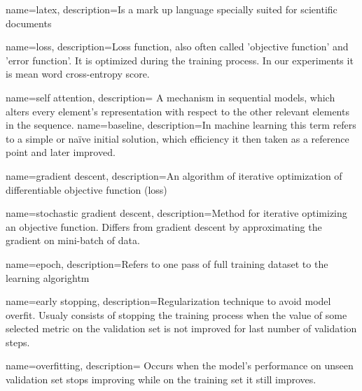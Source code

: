 

\makeglossaries

{
    name=latex,
    description={Is a mark up language specially suited 
    for scientific documents}
}

{
    name=loss,
    description={Loss function, also often called 'objective function' and
		 'error function'. It is optimized during the training
		 process. In our experiments it is mean word cross-entropy score.}
}

{
    name=self attention,
    description={
		A mechanism in sequential models, which alters every element's
		representation with respect to the other relevant elements in the
		sequence.
		}
}
{
    name=baseline,
    description={In machine learning this term refers to a simple or
		 naïve initial solution, which efficiency it then
		 taken as a reference point and later improved.
		}
}

{
    name=gradient descent,
    description={An algorithm of iterative optimization of 
		 differentiable objective function (loss)}
}

{
    name=stochastic gradient descent,
    description={Method for iterative optimizing an objective function.
		 Differs from gradient descent by approximating the gradient
		 on mini-batch of data.}
}

{
    name=epoch,
    description={Refers to one pass of full training dataset to the learning 
		 algorightm
		}
}

{
    name=early stopping,
    description={Regularization technique to avoid model overfit.
		 Usualy consists of stopping the training process
		 when the value of some selected metric on the 
		 validation set is not improved for last number of
		 validation steps.
		}
}

{
    name=overfitting,
    description={
		 Occurs when the model's performance on unseen validation
		 set stops improving while on the training set
		 it still improves.
		}
}

